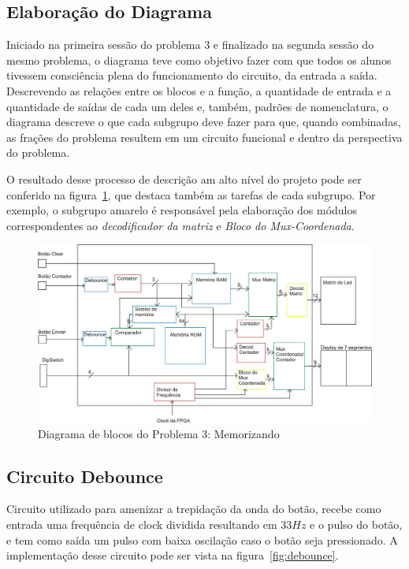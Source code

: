 \documentclass[12pt]{article}
\begin{document}
\subsection{Elaboração do Diagrama}
Iniciado na primeira sessão do problema 3 e finalizado na segunda sessão do mesmo problema, o diagrama teve como objetivo fazer com que todos os alunos tivessem consciência plena do funcionamento do circuito, da entrada a saída. Descrevendo as relações entre os blocos e a função, a quantidade de entrada e a quantidade de saídas de cada um deles e, também,  padrões de nomenclatura, o diagrama descreve o que cada subgrupo deve fazer para que, quando combinadas, as frações do problema resultem em um circuito funcional e dentro da perspectiva do problema. 

O resultado desse processo de descrição am alto nível do projeto pode ser conferido na figura~\ref{fig:diagrama}, que destaca também as tarefas de cada subgrupo. Por exemplo, o subgrupo amarelo é responsável pela elaboração dos módulos correspondentes ao \textit{decodificador da matriz} e \textit{Bloco do Mux-Coordenada}.

\begin{figure}[H]
\centering
\includegraphics[width=1\textwidth]{img/diagrama.jpg}
\caption{Diagrama de blocos do Problema 3: Memorizando}
\label{fig:diagrama}
\end{figure}



\subsection{Circuito Debounce}
Circuito utilizado para amenizar a trepidação da onda do botão, recebe como entrada uma frequência de clock dividida resultando em 33$Hz$ e o pulso do botão, e tem como saída um pulso com baixa oscilação caso o botão seja pressionado. A implementação desse circuito pode ser vista na figura~\ref{fig:debounce}.
\end{document}
